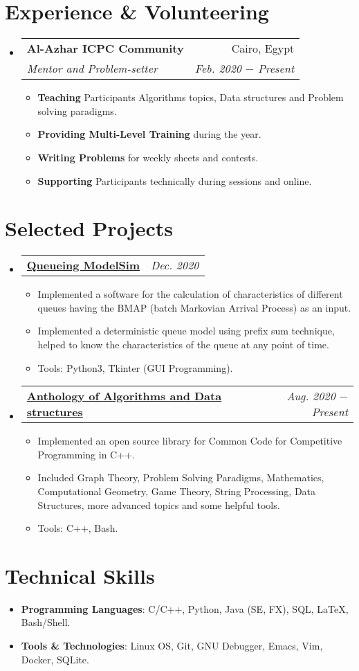 \documentclass[letterpaper, 11pt]{article}
\makeatletter
\newcommand{\experienceItem}[4] {
  \vspace{-1pt}\item
  \begin{tabular*}{0.97\textwidth}[t]{l@{\extracolsep{\fill}}r}
    \textbf{#1} & #2 \\
    \textit{\small #3} & \textit{\small #4} \\
  \end{tabular*}\vspace{-5pt}
}
\newcommand{\experienceSubItem}[2] {\item\small{\textbf{#1}{#2 \vspace{-2pt}}}}
\newcommand{\projectItem}[2] {
  \vspace{-1pt}\item
  \begin{tabular*}{0.97\textwidth}[t]{l@{\extracolsep{\fill}}r}
    \textbf{#1} & \textit{\small #2} \\
  \end{tabular*}\vspace{-5pt}
}
\newcommand{\projectSubItem}[1] {\item\small{#1 \vspace{-2pt}}}
\newcommand{\techSkillItem}[2] {\item\small{\textbf{#1}{#2 \vspace{-2pt}}}}
\makeatother
\begin{document}
\section{Experience \& Volunteering}
\begin{itemize}[leftmargin=*]
  \experienceItem{Al-Azhar ICPC Community}{Cairo, Egypt}{Mentor and Problem-setter}{Feb. 2020 $-$ Present}
  \begin{itemize}
    \experienceSubItem{Teaching}{ Participants Algorithms topics, Data structures and Problem solving paradigms.}
    \experienceSubItem{Providing Multi-Level Training}{ during the year.}
    \experienceSubItem{Writing Problems}{ for weekly sheets and contests.}
    \experienceSubItem{Supporting}{ Participants technically during sessions and online.}
  \end{itemize}\vspace{-5pt}
\end{itemize}

\section{Selected Projects}
\begin{itemize}[leftmargin=*]
  \projectItem{\faIcon{user-clock} \href{https://github.com/AbdeltwabMF/Queueing-ModelSim}{Queueing ModelSim}}{Dec. 2020}
  \begin{itemize}
    \projectSubItem{Implemented a software for the calculation of characteristics of different queues having the BMAP (batch Markovian Arrival Process) as an input.}
    \projectSubItem{Implemented a deterministic queue model using prefix sum technique, helped to know the characteristics of the queue at any point of time.}
    \projectSubItem{Tools: Python3, Tkinter (GUI Programming).}
  \end{itemize}\vspace{-5pt}

  \projectItem{\faIcon{laptop-code} \href{https://github.com/AbdeltwabMF/Anthology-of-Algorithms-and-Data-structures}{Anthology of Algorithms and Data structures}}{Aug. 2020 $-$ Present}
  \begin{itemize} 
    \projectSubItem{Implemented an open source library for Common Code for Competitive Programming in C++.}
    \projectSubItem{Included Graph Theory, Problem Solving Paradigms, Mathematics, Computational Geometry, Game Theory, String Processing, Data Structures, more advanced topics and some helpful tools.}
    \projectSubItem{Tools: C++, Bash.}
  \end{itemize}\vspace{-5pt}
\end{itemize}

\section{Technical Skills}
\begin{itemize}[leftmargin=*]
  \techSkillItem{Programming Languages}{: C/C++, Python, Java (SE, FX), SQL, \LaTeX{}, Bash/Shell.}
  \techSkillItem{Tools \& Technologies}{: Linux OS, Git, GNU Debugger, Emacs, Vim, Docker, SQLite.}
\end{itemize}
\end{document}
